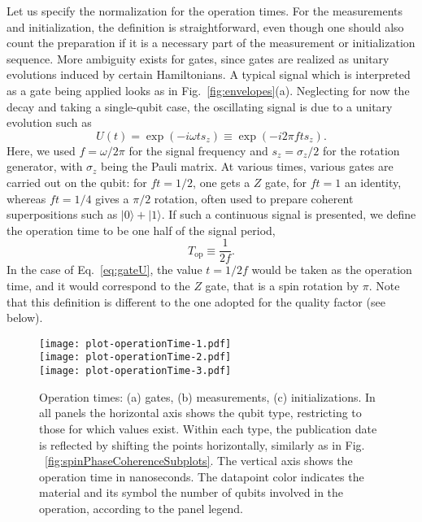 \documentclass[aps, prx, showpacs, twocolumn, superscriptaddress, notitlepage, longbibliography, floatfix, nofootinbib]{revtex4-2}
\begin{document}
Let us specify the normalization for the operation times. For the measurements and initialization, the definition is straightforward, even though one should also count the preparation if it is a necessary part of the measurement or initialization sequence. More ambiguity exists for gates, since gates are realized as unitary evolutions induced by certain Hamiltonians. A typical signal which is interpreted as a gate being applied looks as in Fig.~\ref{fig:envelopes}(a). Neglecting for now the decay and taking a single-qubit case, the oscillating signal is due to a unitary evolution such as
\begin{equation}
U(t) = \exp\left( -i \omega t s_z \right) \equiv \exp \left( -i 2\pi f t s_z \right).
\label{eq:gateU}
\end{equation}
Here, we used $f = \omega / 2\pi$ for the signal frequency and $s_z = \sigma_z/2$ for the rotation generator, with $\sigma_z$ being the Pauli matrix.
At various times, various gates are carried out on the qubit: for $f t=1/2$, one gets a $Z$ gate, for $f t=1$ an identity, whereas $f t=1/4$ gives a $\pi/2$ rotation, often used to prepare coherent superpositions such as $|0\rangle +|1\rangle$. If such a continuous signal is presented, we define the operation time to be one half of the signal period,
\begin{equation}
T_\mathrm{op} \equiv \frac{1}{2f}.
\label{eq:gateTime}
\end{equation}
In the case of Eq.~\eqref{eq:gateU}, the value $t=1/2f$ would be taken as the operation time, and it would correspond to the $Z$ gate, that is a spin rotation by $\pi$. Note that this definition is different to the one adopted for the quality factor (see below).

\begin{figure}[t!]
  \texttt{[image: plot-operationTime-1.pdf]} \hfill\\
  \texttt{[image: plot-operationTime-2.pdf]} \hfill\\
  \texttt{[image: plot-operationTime-3.pdf]}\\
  \caption{
  \label{fig:operationTime}
    Operation times: (a) gates, (b) measurements, (c) initializations. In all panels the horizontal axis shows the qubit type, restricting to those for which values exist. Within each type, the publication date is reflected by shifting the points horizontally, similarly as in Fig. ~\ref{fig:spinPhaseCoherenceSubplots}. The vertical axis shows the operation time in nanoseconds. The datapoint color indicates the material and its symbol the number of qubits involved in the operation, according to the panel legend. 
  }
\end{figure}
\end{document}
